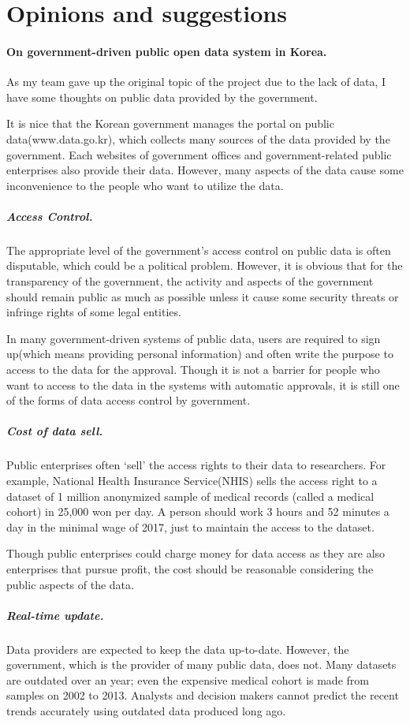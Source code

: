 \documentclass{article}
\begin{document}
\section*{Opinions and suggestions}
\paragraph{On government-driven public open data system in Korea.}
As my team gave up the original topic of the project due to the lack of data, I
have some thoughts on public data provided by the government.

It is nice that the Korean government manages the portal on public
data(www.data.go.kr), which collects many sources of the data provided by the
government. Each websites of government offices and government-related
public enterprises also provide their data. However, many aspects of the data
cause some inconvenience to the people who want to utilize the data.

\subparagraph{Access Control.}
The appropriate level of the government's access control on
public data is often disputable, which could be a political problem. However, it is obvious
that for the transparency of the government, the activity and aspects of the
government should remain public as much as possible unless it cause some
security threats or infringe rights of some legal entities.

In many government-driven systems of public data, users are required to sign
up(which means providing personal information) and often write
the purpose to access to the data for the approval. Though it is not a
barrier for people who want to access to the data in the systems with
automatic approvals, it is still one of the forms of data access control by
government.

\subparagraph{Cost of data sell.}
Public enterprises often `sell' the access rights to their data to
researchers. For example, National Health Insurance Service(NHIS) sells the
access right to a dataset of 1 million anonymized sample of medical records
(called a medical cohort) in 25,000 won per day. A person should work 3 hours
and 52 minutes a day in the minimal wage of 2017, just to maintain the access to
the dataset.

Though public enterprises could charge money for data access as they are also
enterprises that pursue profit, the cost should be reasonable considering the public aspects of the data.

\subparagraph{Real-time update.}
Data providers are expected to keep
the data up-to-date. However, the government, which is the provider of many
public data, does not. Many datasets are outdated over an year; even the
expensive medical cohort is made from samples on 2002 to 2013.
Analysts and decision makers cannot predict the recent trends accurately using
outdated data produced long ago.
\end{document}
